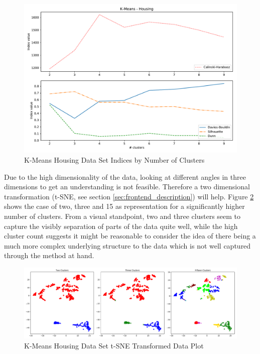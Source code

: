 \begin{figure}[H]
\begin{center}
\includegraphics[width=1.0\textwidth]{images/kmeans_housing_index_plot.pdf}
\end{center}
\caption{K-Means Housing Data Set Indices by Number of Clusters}
\label{fig:kmeans_housing_indices_plot}
\end{figure}

Due to the high dimensionality of the data, looking at different angles in three dimensions to get an understanding is not feasible. Therefore a two dimensional transformation (t-SNE, see section \ref{sec:frontend_description}) will help. Figure \ref{fig:kmeans_housing_2d_comparison} shows the case of two, three and 15 as representation for a significantly higher number of clusters. From a visual standpoint, two and three clusters seem to capture the visibly separation of parts of the data quite well, while the high cluster count suggests it might be reasonable to consider the idea of there being a much more complex underlying structure to the data which is not well captured through the method at hand.

\begin{figure}[H]
\begin{center}
\includegraphics[width=1.0\textwidth]{images/kmeans_housing_tsne.pdf}
\end{center}
\caption{K-Means Housing Data Set t-SNE Transformed Data Plot}
\label{fig:kmeans_housing_2d_comparison}
\end{figure}
\vspace{-0.5cm}

